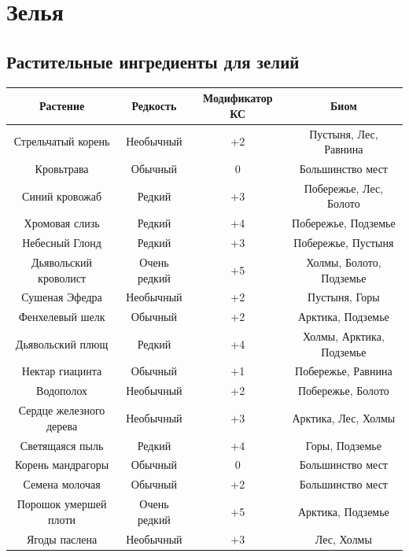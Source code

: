 \documentclass[a4paper, 9pt, twocolumn]{book}
\begin{document}

	\section{Зелья}
	
	\subsection{Растительные ингредиенты для зелий}


	\begin{tabular}{|c|c|c|c|}
		\hline
		\textbf{Растение} & \textbf{Редкость} & \textbf{Модификатор КС} & \textbf{Биом} \\
		\hline
		Стрельчатый корень & Необычный & +2 & Пустыня, Лес, Равнина \\
		\hline
		Кровьтрава & Обычный & 0 & Большинство мест \\
		\hline
		Синий кровожаб & Редкий & +3 & Побережье, Лес, Болото \\
		\hline
		Хромовая слизь & Редкий & +4 & Побережье, Подземье \\
		\hline
		Небесный Глонд & Редкий & +3 & Побережье, Пустыня \\
		\hline
		Дьявольский кроволист & Очень редкий & +5 & Холмы, Болото, Подземье \\
		\hline
		Сушеная Эфедра & Необычный & +2 & Пустыня, Горы \\
		\hline
		Фенхелевый шелк & Обычный & +2 & Арктика, Подземье \\
		\hline
		Дьявольский плющ & Редкий  & +4 & Холмы, Арктика, Подземье \\
		\hline
		Нектар гиацинта & Обычный & +1 & Побережье, Равнина \\
		\hline
		Водополох & Необычный & +2 & Побережье, Болото \\
		\hline
		Сердце железного дерева & Необычный & +3 & Арктика, Лес, Холмы \\
		\hline
		Светящаяся пыль & Редкий & +4 & Горы, Подземье \\
		\hline
		Корень мандрагоры & Обычный & 0 & Большинство мест \\
		\hline
		Семена молочая & Обычный & +2 & Большинство мест \\
		\hline
		Порошок умершей плоти & Очень редкий & +5 & Арктика, Подземье \\
		\hline
		Ягоды паслена & Необычный & +3 & Лес, Холмы \\

\end{tabular}
\end{document}
